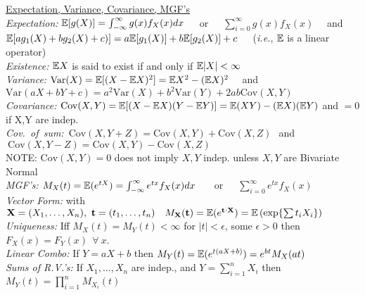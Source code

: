 \documentclass[11pt]{article}
\newcommand{\Var}{\ensuremath{\mathrm{Var}}}
\newcommand{\Cov}{\ensuremath{\mathrm{Cov}}}
\newcommand{\Exp}{\Bbb{E}}
\def\ie{{\em i.e.},\xspace }
\begin{document}
\baselineskip 20pt
\oddsidemargin 0in
\evensidemargin 0in
\topmargin -28pt
\setlength{\headsep}{-.2in}
\headheight 0pt
\pagestyle{empty}
\setlength{\parindent}{-2em}
\small
\indent\underline{Expectation, Variance, Covariance, MGF's}\\
{\it Expectation:} $\Exp[g(X)] = \int_{-\infty}^\infty g(x)f_X(x)dx$\ \ \ or\ \ \ 
$\sum_{i=0}^\infty g(x)f_X(x)$ \ \ and\\
\hspace*{1.5em}$\Exp[ag_1(X) + bg_2(X) + c)] = a\Exp[g_1(X)] + b\Exp[g_2(X)]+ c$~~~(\ie
$\Exp$ is a linear operator) \\
\hspace*{1.5em}\textsl{Existence:}  $\Exp X$ is said to exist if and only if
$\Exp|X|<\infty$\\
%
{\it Variance:} $\Var(X) = \Exp[(X-\Exp X)^2] = \Exp X^2 - (\Exp X)^2$ \ \ and\\
\hspace*{1.5em}$\Var(aX + bY + c) =
a^2\Var(X) + b^2\Var(Y) + 2ab\Cov(X,Y)$\\
%
{\it Covariance:}  $\Cov (X,Y) = \Exp[(X-\Exp X)(Y-\Exp Y)] = \Exp(XY) - (\Exp X)(\Exp Y)$  and $= 0 $ if X,Y are
indep.\\
\mbox{{\it Cov.\ of sum:} $\Cov (X,Y+Z) = \Cov(X,Y) +\Cov(X,Z)  \ $ and $\   \Cov (X,Y-Z) =
\Cov(X,Y) -\Cov(X,Z)$}       \\
\hspace*{1.5em}NOTE:  $\Cov(X,Y) =0$ does not imply $X,Y$ indep. unless $X,Y$ are
Bivariate Normal\\
%
{\it MGF's:} $M_X(t) = \Exp(e^{tX}) =  \int_{-\infty}^\infty e^{tx}f_X(x)dx$  \ \ \ or\ \ \ 
$\sum_{i=0}^\infty e^{tx}f_X(x)$\\
\hspace*{1.5em}\textsl{Vector Form:}  with $\mathbf{X} = (X_1,\ldots, X_n),\
\mathbf{t}=(t_1,\ldots,t_n)\ \ \ M_{\mathbf{X}}(\mathbf{t}) = \Exp(e^{\mathbf{t}\cdot
\mathbf{X}}) = \Exp\left(\exp\{\sum t_i X_i\}\right)$\\
%
\hspace*{1.5em}\textsl{Uniqueness:} Iff $M_X(t) = M_Y(t)<\infty$ for $|t| < \epsilon$, some
$\epsilon > 0$ then $F_X(x) = F_Y(x)\ \ \forall \ x$.\\
%
\hspace*{1.5em}\textsl{Linear Combo:} If $Y=aX+b$ then $M_Y(t) = \Exp(e^{t(aX+b)}) = e^{bt}
M_X(at)$\\
%
\hspace*{1.5em}\textsl{Sums of R.V.'s:} If $X_1,\ldots,X_n$ are indep., and
$Y=\sum_{i=1}^n X_i$ then $M_Y(t) = \prod_{i=1}^n M_{X_i}(t)$
\end{document}
